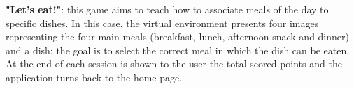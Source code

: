 \documentclass[a4paper, 12pt]{article}
\begin{document}
\textbf{"Let’s eat!"}: this game aims to teach how to associate meals of the day to specific dishes. In this case, the virtual environment presents four images representing the four main meals (breakfast, lunch, afternoon snack and dinner) and a dish: the goal is to select the correct meal in which the dish can be eaten. \\

At the end of each session is shown to the user the total scored points and the application turns back to the home page. 
\end{document}
